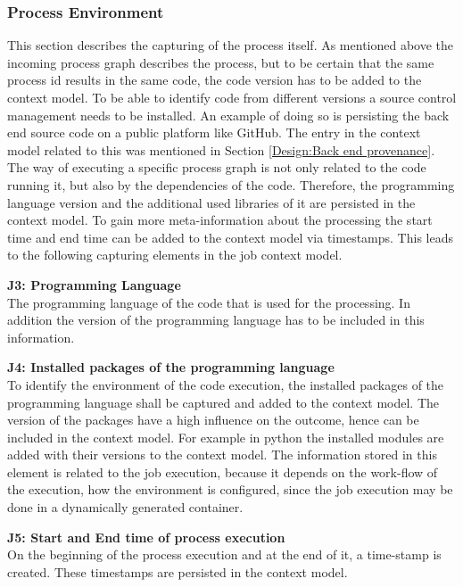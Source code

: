 \documentclass[draft,final]{vutinfth} %
\begin{document}
\subsubsection{Process Environment}\label{Job:Process Data}
This section describes the capturing of the process itself. As mentioned above the incoming process graph describes the process, but to be certain that the same process id results in the same code, the code version has to be added to the context model. To be able to identify code from different versions a source control management needs to be installed. An example of doing so is persisting the back end source code on a public platform like GitHub. The entry in the context model related to this was mentioned in Section \ref{Design:Back end provenance}.  \\
The way of executing a specific process graph is not only related to the code running it, but also by the dependencies of the code. Therefore, the programming language version and the additional used libraries of it are persisted in the context model. To gain more meta-information about the processing the start time and end time can be added to the context model via timestamps. This leads to the following capturing elements in the job context model.

\textbf{J3: Programming Language}\\
The programming language of the code that is used for the processing. In addition the version of the programming language has to be included in this information.

\textbf{J4: Installed packages of the programming language}\\
To identify the environment of the code execution, the installed packages of the programming language shall be captured and added to the context model. The version of the packages have a high influence on the outcome, hence can be included in the context model. For example in python the installed modules are added with their versions to the context model. The information stored in this element is related to the job execution, because it depends on the work-flow of the execution, how the environment is configured, since the job execution may be done in a dynamically generated container.

\textbf{J5: Start and End time of process execution}\\
On the beginning of the process execution and at the end of it, a time-stamp is created. These timestamps are persisted in the context model.
\end{document}
